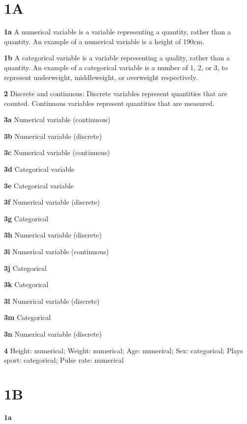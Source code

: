 \documentclass{article}
\begin{document}
\begin{multicols*}{2}
\section*{1A}

\textbf{1a}
A numerical variable is a variable representing a quantity, rather than a quantity. An example of a numerical variable is a height of 190cm.

\textbf{1b}
A categorical variable is a variable representing a quality, rather than a quantity. An example of a categorical variable is a number of 1, 2, or 3, to represent underweight, middleweight, or overweight respectively.

\textbf{2}
Discrete and continuous: Discrete variables represent quantities that are counted. Continuous variables represent quantities that are measured.

\textbf{3a}
Numerical variable (continuous)

\textbf{3b}
Numerical variable (discrete)

\textbf{3c}
Numerical variable (continuous)

\textbf{3d}
Categorical variable

\textbf{3e}
Categorical variable

\textbf{3f}
Numerical variable (discrete)

\textbf{3g}
Categorical

\textbf{3h}
Numerical variable (discrete)

\textbf{3i}
Numerical variable (continuous)

\textbf{3j}
Categorical

\textbf{3k}
Categorical

\textbf{3l}
Numerical variable (discrete)

\textbf{3m}
Categorical

\textbf{3n}
Numerical variable (discrete)

\textbf{4}
Height: numerical; Weight: numerical; Age: numerical; Sex: categorical; Plays sport: categorical; Pulse rate: numerical

\section*{1B}

\textbf{1a}


\end{multicols*}
\end{document}
